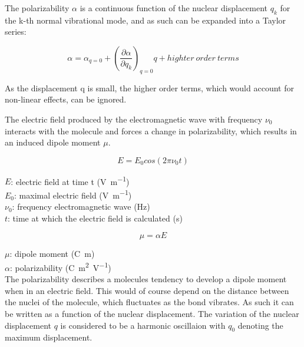 \bigskip

\cite{theory1}

\bigskip

The polarizability \(\alpha\) is a continuous function of the nuclear displacement \(q_k\) for the k-th normal vibrational mode, and as such can be expanded into a Taylor series:

\begin{equation} \label{eq:polarizability}
    \alpha=\alpha_{q=0} + 
    \left( \frac{\partial\alpha}{\partial q_k}\right)_{q=0}q + highter\:order\:terms
\end{equation}



As the displacement q is small, the higher order terms, which would account for non-linear effects, can be ignored. 

\bigskip

The electric field produced by the electromagnetic wave with frequency \(\nu_0\) interacts with the molecule and forces a change in polarizability, which results in an induced dipole moment \(\mu\).

\begin{equation} \label{eq:electic_field}
    E = E_0cos(2\pi\nu_0t)
\end{equation}

\(E\): electric field at time t (\unit{\volt\per\meter})\\
\(E_0\): maximal electric field (\unit{\volt\per\meter})\\
\(\nu_0\): frequency electromagnetic wave (\unit{\hertz}) \\
\(t\): time at which the electric field is calculated (\unit{\second})

\begin{equation} \label{eq:dipole_moment}
    \mu = \alpha E
\end{equation}

\(\mu\): dipole moment (\unit{\coulomb\meter}) \\
\(\alpha \): polarizability 
(\unit{\coulomb\meter\squared\per\volt})\\


The polarizability describes a molecules tendency to develop a dipole moment when in an electric field. This would of course depend on the distance between the nuclei of the molecule, which fluctuates as the bond vibrates. As such it can be written as a function of the nuclear displacement. The variation of the nuclear displacement \(q\) is considered to be a harmonic oscillaion with \(q_0\) denoting the maximum displacement.

